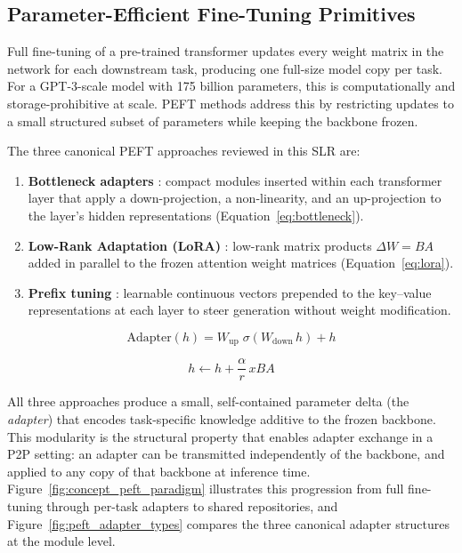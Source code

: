 \subsection{Parameter-Efficient Fine-Tuning Primitives}
\label{sec:background:peft}

Full fine-tuning of a pre-trained transformer updates every weight matrix in the
network for each downstream task, producing one full-size model copy per task.
For a GPT-3-scale model with 175 billion parameters, this is computationally and
storage-prohibitive at scale. PEFT methods address this by restricting updates to a
small structured subset of parameters while keeping the backbone frozen.

The three canonical PEFT approaches reviewed in this SLR are:
\begin{enumerate}
\sloppy
  \item \textbf{Bottleneck adapters} \cite{Houlsby2019}: compact modules inserted
    within each transformer layer that apply a down-projection, a non-linearity, and
    an up-projection to the layer's hidden representations (Equation~\ref{eq:bottleneck}).
  \item \textbf{Low-Rank Adaptation (LoRA)} \cite{Hu2022}: low-rank matrix products
    $\Delta W = BA$ added in parallel to the frozen attention weight matrices
    (Equation~\ref{eq:lora}).
  \item \textbf{Prefix tuning} \cite{LiLiang2021}: learnable continuous vectors
    prepended to the key--value representations at each layer to steer generation
    without weight modification.
\fussy
\end{enumerate}

\begin{equation}
\mathrm{Adapter}(h) = W_{\mathrm{up}} \; \sigma( W_{\mathrm{down}} \, h ) + h
\label{eq:bottleneck}
\end{equation}

\begin{equation}
h \gets h + \frac{\alpha}{r}\, x B A
\label{eq:lora}
\end{equation}

All three approaches produce a small, self-contained parameter delta (the \textit{adapter})
that encodes task-specific knowledge additive to the frozen backbone. This modularity
is the structural property that enables adapter exchange in a P2P setting: an adapter
can be transmitted independently of the backbone, and applied to any copy of that
backbone at inference time. Figure~\ref{fig:concept_peft_paradigm} illustrates 
this progression from full fine-tuning through per-task adapters to shared 
repositories, and Figure~\ref{fig:peft_adapter_types} compares the three 
canonical adapter structures at the module level.

